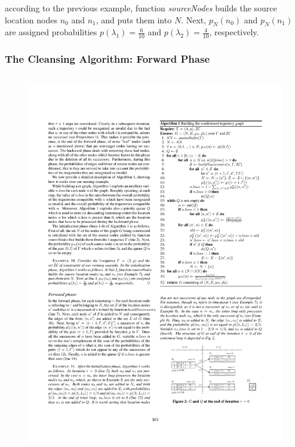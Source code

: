 \begin{frame}
\begin{columns}
\end{columns}

\begin{example}
  according to the previous example, function \emph{sourceNodes} builds the source location nodes $n_0$ and $n_1$, and puts them into $N$. Next, $p_N(n_0)$ and $p_N(n_1)$ are assigned probabilities $p(\lambda_1) = \frac{6}{10}$ and $p(\lambda_2) = \frac{4}{10}$, respectively.
\end{example}

\end{frame}


\begin{frame}
\frametitle{The Cleansing Algorithm: Forward Phase}

\begin{columns}

  \begin{figure}[tb]
    \includegraphics[width=\columnwidth]{figures/3-4/3-4-5.pdf}
  \end{figure}


\end{columns}
\end{frame}
